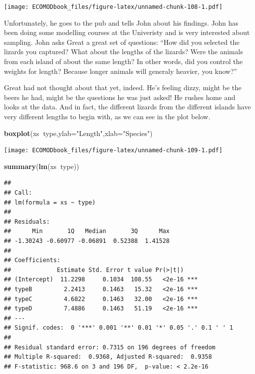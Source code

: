 \documentclass[
]{book}
\newenvironment{Shaded}{\begin{snugshade}}{\end{snugshade}}
\newcommand{\DataTypeTok}[1]{\textcolor[rgb]{0.13,0.29,0.53}{#1}}
\newcommand{\KeywordTok}[1]{\textcolor[rgb]{0.13,0.29,0.53}{\textbf{#1}}}
\newcommand{\NormalTok}[1]{#1}
\newcommand{\OperatorTok}[1]{\textcolor[rgb]{0.81,0.36,0.00}{\textbf{#1}}}
\newcommand{\StringTok}[1]{\textcolor[rgb]{0.31,0.60,0.02}{#1}}
\begin{document}
\texttt{[image: ECOMODbook\_files/figure-latex/unnamed-chunk-108-1.pdf]}

Unfortunately, he goes to the pub and tells John about his findings. John has been doing some modelling courses at the Univeristy and is very interested about sampling.
John asks Great a great set of questions: ``How did you selected the lizards you captured? What about the lengths of the lizards? Were the animals from each island of about the same length? In other words, did you control the weights for length? Because longer animals will generaly heavier, you know?''

Great had not thought about that yet, indeed. He's feeling dizzy, might be the beers he had, might be the questions he was just asked! He rushes home and looks at the data. And in fact, the different lizards from the different islands have very different lengths to begin with, as we can see in the plot below.

\begin{Shaded}
\begin{Highlighting}[]
\KeywordTok{boxplot}\NormalTok{(xs}\OperatorTok{~}\NormalTok{type,}\DataTypeTok{ylab=}\StringTok{"Length"}\NormalTok{,}\DataTypeTok{xlab=}\StringTok{"Species"}\NormalTok{)}
\end{Highlighting}
\end{Shaded}

\texttt{[image: ECOMODbook\_files/figure-latex/unnamed-chunk-109-1.pdf]}

\begin{Shaded}
\begin{Highlighting}[]
\KeywordTok{summary}\NormalTok{(}\KeywordTok{lm}\NormalTok{(xs}\OperatorTok{~}\NormalTok{type))}
\end{Highlighting}
\end{Shaded}

\begin{verbatim}
## 
## Call:
## lm(formula = xs ~ type)
## 
## Residuals:
##      Min       1Q   Median       3Q      Max 
## -1.30243 -0.60977 -0.06891  0.52388  1.41528 
## 
## Coefficients:
##             Estimate Std. Error t value Pr(>|t|)    
## (Intercept)  11.2298     0.1034  108.55   <2e-16 ***
## typeB         2.2413     0.1463   15.32   <2e-16 ***
## typeC         4.6822     0.1463   32.00   <2e-16 ***
## typeD         7.4886     0.1463   51.19   <2e-16 ***
## ---
## Signif. codes:  0 '***' 0.001 '**' 0.01 '*' 0.05 '.' 0.1 ' ' 1
## 
## Residual standard error: 0.7315 on 196 degrees of freedom
## Multiple R-squared:  0.9368,	Adjusted R-squared:  0.9358 
## F-statistic: 968.6 on 3 and 196 DF,  p-value: < 2.2e-16
\end{verbatim}
\end{document}

